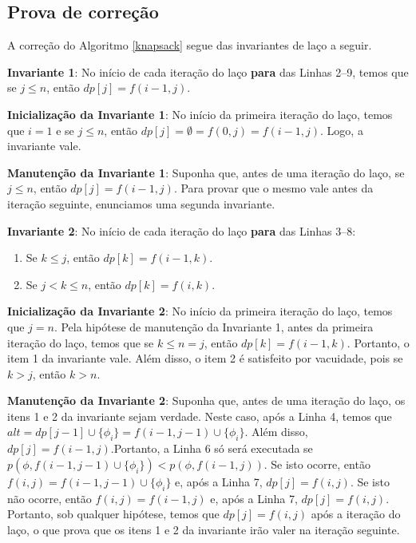 \subsection{Prova de correção}

\indent

A correção do Algoritmo \ref{knapsack} segue das invariantes de laço a seguir.

\textbf{Invariante 1}: No início de cada iteração do laço \textbf{para} das Linhas 2--9, temos que se $j \leq n$, então $dp[j] = f(i-1,j)$.

\textbf{Inicialização da Invariante 1}: No início da primeira iteração do laço, temos que $i = 1$ e se $j \leq n$, então $dp[j] = \emptyset = f(0,j) = f(i-1,j)$. Logo, a invariante vale.

\textbf{Manutenção da Invariante 1}: Suponha que, antes de uma iteração do laço, se $j \leq n$, então $dp[j] = f(i-1,j)$. Para provar que o mesmo vale antes da iteração seguinte, enunciamos uma segunda invariante.

\textbf{Invariante 2}: No início de cada iteração do laço \textbf{para} das Linhas 3--8:
\begin{enumerate}
	\item Se $k \leq j$, então $dp[k] = f(i-1,k)$.
	\item Se $j < k \leq n$, então $dp[k] = f(i,k)$.
\end{enumerate}

\textbf{Inicialização da Invariante 2}: No início da primeira iteração do laço, temos que $j = n$. Pela hipótese de manutenção da Invariante 1, antes da primeira iteração do laço, temos que se $k \leq n = j$, então $dp[k] = f(i-1,k)$. Portanto, o item 1 da invariante vale. Além disso, o item 2 é satisfeito por vacuidade, pois se $k > j$, então $k > n$.

\textbf{Manutenção da Invariante 2}: Suponha que, antes de uma iteração do laço, os itens 1 e 2 da invariante sejam verdade. Neste caso, após a Linha 4, temos que\break $alt = dp[j-1] \cup \{\phi_i \} = f(i-1,j-1) \cup \{\phi_i \}$. Além disso, $dp[j] = f(i-1,j)$.\break Portanto, a Linha 6 só será executada se $p(\phi,f(i-1,j-1) \cup \{\phi_i \}) < p(\phi,f(i-1,j))$. Se isto ocorre, então $f(i,j) = f(i-1,j-1) \cup \{\phi_i \}$ e, após a Linha 7, $dp[j] = f(i,j)$. Se isto não ocorre, então $f(i,j) = f(i-1,j)$ e, após a Linha 7, $dp[j] = f(i,j)$. Portanto, sob qualquer hipótese, temos que $dp[j] = f(i,j)$ após a iteração do laço, o que prova que os itens 1 e 2 da invariante irão valer na iteração seguinte.

